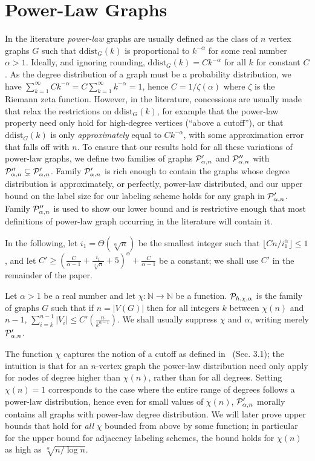 
 \section{Power-Law Graphs}\label{Sec:GraphFamilies}

In the literature \emph{power-law} graphs are usually defined as the class of $n$ vertex graphs $G$ such that $\mathrm{ddist}_G(k)$
is proportional to $k^{-\alpha}$ for some real number $\alpha > 1$. Ideally, and ignoring rounding,  $\mathrm{ddist}_G(k) = Ck^{-\alpha}$ for all $k$ for constant $C$. As the degree distribution of a graph must be a probability distribution, we have $\sum_{k=1}^\infty C k^{-\alpha} = C \sum_{k=1}^\infty k^{-\alpha} = 1$, hence  $C = 1/\zeta(\alpha)$ where $\zeta$ is the Riemann zeta function. However, in the literature, concessions are usually made that relax
the restrictions on $\mathrm{ddist}_G(k)$, for example that the power-law property need only hold for high-degree
vertices (``above a cutoff''), or that $\mathrm{ddist}_G(k)$ is only \emph{approximately} equal to $Ck^{-\alpha}$,
with some approximation error that falls off with $n$.
To ensure that our results hold for all these variations of power-law graphs, 
 we define two families of graphs $ \mathcal{P}'_{\alpha,n}$ and $ \mathcal{P}''_{\alpha,n}$ with $ \mathcal{P}''_{\alpha,n}\subsetneq \mathcal{P}'_{\alpha,n}$. Family $ \mathcal{P}'_{\alpha,n}$ is rich enough to contain the graphs whose degree distribution is approximately, or perfectly, power-law distributed, and our upper bound on the label size for our labeling scheme holds for any graph in $ \mathcal{P}'_{\alpha,n}$. Family $ \mathcal{P}''_{\alpha,n}$ is used to show our lower bound
 and is restrictive enough that most definitions of power-law graph occurring in the literature will contain it. 
 
In the following, let $i_1 = \Theta(\sqrt[\alpha]n)$ be the smallest integer such that $\lfloor Cn/i_1^\alpha\rfloor \leq 1$, and let $C'\geq(\frac C{\alpha-1} + \frac{i_1}{\sqrt[\alpha] n} + 5)^{\alpha} + \frac{C}{\alpha - 1}$ be a constant; we shall use $C'$ in the remainder of the paper.
\begin{definition} \label{def:general-family}
Let $\alpha > 1$ be a real number and let $\chi:\mathbb N\rightarrow\mathbb N$ be a function. $ \mathcal{P}_{h,\chi,\alpha}$ is the family of graphs $G$ such that if $n = \vert V(G)\vert$ then for all integers $k$ between $\chi(n)$ and $n-1$, $\sum_{i = k}^{n-1} {\vert V_i\vert} \leq C'(\frac{n}{k^{\alpha-1}})$. We shall usually suppress $\chi$ and $\alpha$, writing merely $ \mathcal{P}'_{\alpha,n}$.
\end{definition}
The function $\chi$ captures the notion of a cutoff as defined in~\cite{clauset2009power} (Sec. 3.1); the intuition is  that for an $n$-vertex graph the power-law distribution need only apply for nodes of degree higher than $\chi(n)$, rather than for all degrees. 
Setting $\chi(n) = 1$ corresponds to the case where the entire range of degrees follows a power-law distribution, hence
even for small values of $\chi(n)$, $ \mathcal{P}'_{\alpha,n}$ morally contains all graphs with power-law degree distribution.
We will later prove upper bounds that hold for \emph{all} $\chi$ bounded from above by some function; in particular
for the upper bound for adjacency labeling schemes, the bound holds for $\chi(n)$ as high as  $\sqrt[\alpha]{n/\log n}$.


